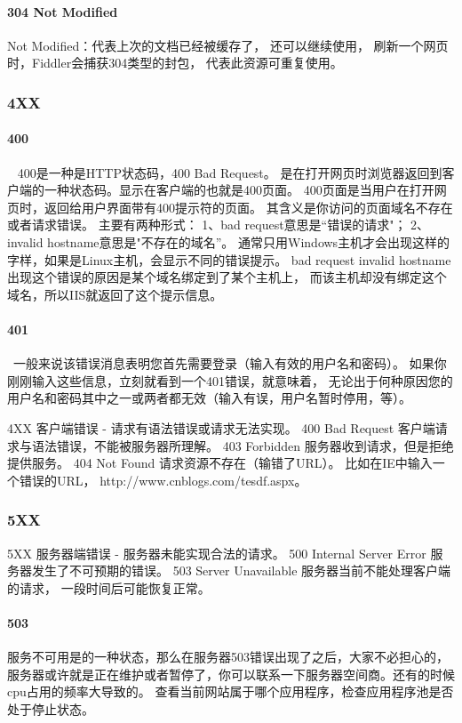 \documentclass{book}
\begin{document}
\paragraph{304 Not Modified} Not Modified：代表上次的文档已经被缓存了， 还可以继续使用，
刷新一个网页时，Fiddler会捕获304类型的封包，
代表此资源可重复使用。

\subsubsection{4XX}

\paragraph{400}~ 400是一种是HTTP状态码，400 Bad Request。
是在打开网页时浏览器返回到客户端的一种状态码。显示在客户端的也就是400页面。
400页面是当用户在打开网页时，返回给用户界面带有400提示符的页面。
其含义是你访问的页面域名不存在或者请求错误。
主要有两种形式：
1、bad request意思是“错误的请求"；
2、invalid hostname意思是"不存在的域名”。
通常只用Windows主机才会出现这样的字样，如果是Linux主机，会显示不同的错误提示。
bad request invalid hostname出现这个错误的原因是某个域名绑定到了某个主机上，
而该主机却没有绑定这个域名，所以IIS就返回了这个提示信息。

\paragraph{401}~一般来说该错误消息表明您首先需要登录（输入有效的用户名和密码）。
如果你刚刚输入这些信息，立刻就看到一个401错误，就意味着，
无论出于何种原因您的用户名和密码其中之一或两者都无效（输入有误，用户名暂时停用，等）。


4XX  客户端错误 - 请求有语法错误或请求无法实现。
400 Bad Request  客户端请求与语法错误，不能被服务器所理解。
403 Forbidden 服务器收到请求，但是拒绝提供服务。
404 Not Found 请求资源不存在（输错了URL）。
比如在IE中输入一个错误的URL， http://www.cnblogs.com/tesdf.aspx。

\subsubsection{5XX}

5XX  服务器端错误 - 服务器未能实现合法的请求。
500 Internal Server Error 服务器发生了不可预期的错误。
503 Server Unavailable 服务器当前不能处理客户端的请求，
一段时间后可能恢复正常。

\paragraph{503}服务不可用是的一种状态，那么在服务器503错误出现了之后，大家不必担心的， 服务器或许就是正在维护或者暂停了，你可以联系一下服务器空间商。还有的时候cpu占用的频率大导致的。
查看当前网站属于哪个应用程序，检查应用程序池是否处于停止状态。
\end{document}
